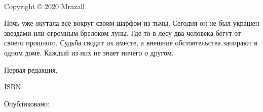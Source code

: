
{\small
\setlength{\parindent}{0em}\setlength{\parskip}{1em}

~

\vfill

Copyright \copyright{} 2020 Mrazall

Ночь уже окутала все вокруг своим шарфом из тьмы. Сегодня он не был украшен звездами или огромным брелоком луны. Где-то в лесу два человека бегут от своего прошлого. Судьба сводит их вместе, а внешние обстоятельства запирают в одном доме. Каждый из них не знает ничего о другом.

Первая редакция, \editionyear{}

ISBN \isbn{}  %

Опубликовано: \publisher{}
}
